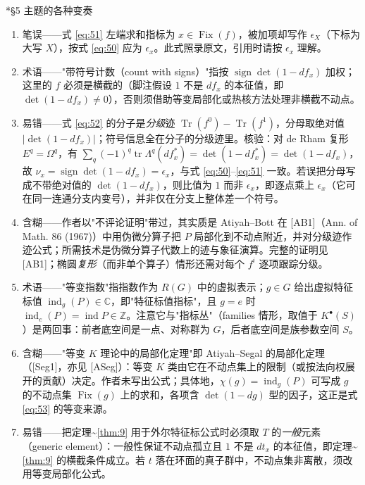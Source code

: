 \documentclass[11pt]{amsart}
\makeatletter
\def\subsection{\@startsection{subsection}{2}%
   \z@{1.25\linespacing\@plus.7\linespacing}{.5\linespacing}%
   {\normalfont\bfseries}}
\theoremstyle{definition}
\theoremstyle{remark}
\theoremstyle{plain}
\numberwithin{equation}{section}
\renewcommand{\:}{\colon}
\newcommand{\CC}{{\mathbb C}}
\DeclareMathOperator{\Tr}{Tr}
\DeclareMathOperator{\tr}{tr}
\newcommand{\ZZ}{{\mathbb Z}}
\DeclareMathOperator{\ind}{ind}
\DeclareMathOperator{\Fix}{Fix}
\DeclareMathOperator{\sign}{sign}
\makeatother
\begin{document}
\subsection*{§5 主题的各种变奏}
\begin{enumerate}[leftmargin=2.2em,itemsep=2pt,topsep=2pt]
  \item 笔误——式 \eqref{eq:51} 左端求和指标为 $x\in \Fix(f)$，被加项却写作 $\epsilon _X$（下标为大写 $X$），按式 \eqref{eq:50} 应为 $\epsilon _x$。此式照录原文，引用时请按 $\epsilon _x$ 理解。
  \item 术语——"带符号计数（count with signs）"指按 $\sign\det(1-df_x)$ 加权；这里的 $f$ 必须是横截的（脚注假设 $1$ 不是 $df_x$ 的本征值，即 $\det(1-df_x)\neq0$），否则须借助等变局部化或热核方法处理非横截不动点。
  \item 易错——式 \eqref{eq:52} 的分子是\emph{分级}迹 $\Tr(f^0)-\Tr(f^1)$，分母取绝对值 $|\det(1-df_x)|$；符号信息全在分子的分级迹里。核验：对 de Rham 复形 $E^q=\Omega^q$，有 $\sum_q(-1)^q\tr\Lambda^q(df_x^*)=\det(1-df_x^*)=\det(1-df_x)$，故 $\nu_x=\sign\det(1-df_x)=\epsilon_x$，与式 \eqref{eq:50}–\eqref{eq:51} 一致。若误把分母写成不带绝对值的 $\det(1-df_x)$，则比值为 $1$ 而非 $\epsilon_x$，即逐点乘上 $\epsilon_x$（它可在同一连通分支内变号），并非仅在分支上整体差一个符号。
  \item 含糊——作者以"不评论证明"带过，其实质是 Atiyah–Bott 在 [AB1]（Ann. of Math. 86 (1967)）中用伪微分算子把 $P$ 局部化到不动点附近，并对分级迹作迹公式；所需技术是伪微分算子代数上的迹与象征演算。完整的证明见 [AB1]；椭圆\emph{复形}（而非单个算子）情形还需对每个 $f^i$ 逐项跟踪分级。
  \item 术语——"等变指数"指指数作为 $R(G)$ 中的虚拟表示；$g\in G$ 给出虚拟特征标值 $\ind_g(P)\in\CC$，即"特征标值指标"，且 $g=e$ 时 $\ind_e(P)=\ind P\in\ZZ$。注意它与"指标丛"（families 情形，取值于 $K^{\bullet }(S)$）是两回事：前者底空间是一点、对称群为 $G$，后者底空间是族参数空间 $S$。
  \item 含糊——"等变 $K$ 理论中的局部化定理"即 Atiyah–Segal 的局部化定理（[Seg1]，亦见 [ASeg]）：等变 $K$ 类由它在不动点集上的限制（或按法向权展开的贡献）决定。作者未写出公式；具体地，$\chi(g)=\ind_g(P)$ 可写成 $g$ 的不动点集 $\Fix(g)$ 上的求和，各项含 $\det(1-dg)$ 型的因子，这正是式 \eqref{eq:53} 的等变来源。
  \item 易错——把定理\textasciitilde{}\ref{thm:9} 用于外尔特征标公式时必须取 $T$ 的\emph{一般}元素（generic element）：一般性保证不动点孤立且 $1$ 不是 $dt_x$ 的本征值，即定理\textasciitilde{}\ref{thm:9} 的横截条件成立。若 $t$ 落在环面的真子群中，不动点集非离散，须改用等变局部化公式。

\end{enumerate}
\end{document}
